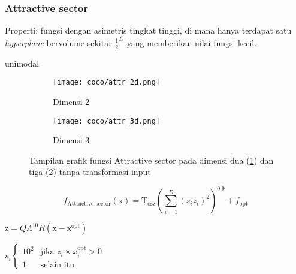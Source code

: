 \subsubsection{Attractive sector}
\noindent Properti:
fungsi dengan asimetris tingkat tinggi, di mana hanya terdapat satu \textit{hyperplane} bervolume sekitar $\frac{1}{2}^D$ yang memberikan nilai fungsi kecil.
\begin{packed_item}
  \item unimodal
\end{packed_item}
\begin{figure}[H]
	\centering
	\begin{subfigure}[b]{0.4\textwidth}
		\centering
		\texttt{[image: coco/attr\_2d.png]}
		\caption{Dimensi 2}
		\label{fig:attr-2d}
	\end{subfigure}
	\hfill
	\begin{subfigure}[b]{0.4\textwidth}
		\centering
		\texttt{[image: coco/attr\_3d.png]}
		\caption{Dimensi 3}
		\label{fig:attr-3d}
	\end{subfigure}
	\caption{Tampilan grafik fungsi Attractive sector pada dimensi dua (\cref{fig:attr-2d}) dan tiga (\cref{fig:attr-3d}) tanpa transformasi input}
	\label{fig:atrr}
\end{figure}
\begin{equation}
  f_{\text{Attractive sector}}(\mathrm{x})=\mathrm{T}_{\text{osz}}(\sum_{i=1}^{D}(s_iz_i)^2)^{0.9}+f_{\text{opt}}
\end{equation}
\begin{packed_item}
    \item $\mathrm{z}=Q\Lambda^{10}R(\mathrm{x}-\mathrm{x}^{\text{opt}})$
    \item $s_i\begin{cases}
      10^2 & \text{jika }z_i\times x_i^{\text{opt}}>0\\
      1 & \text{selain itu}
    \end{cases}$
\end{packed_item}

